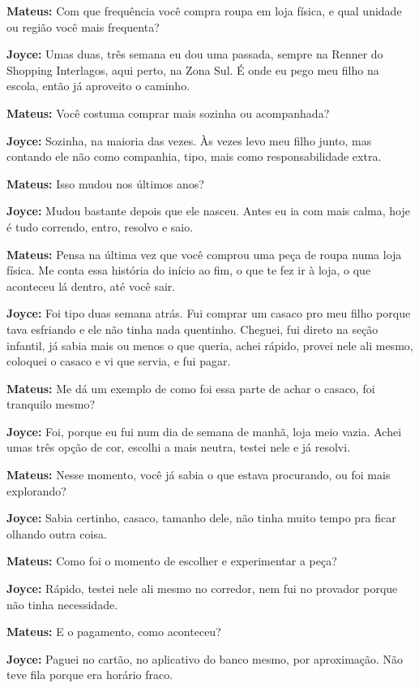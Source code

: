 \textbf{Mateus:} Com que frequência você compra roupa em loja física, e qual unidade ou região você mais frequenta?

\textbf{Joyce:} Umas duas, três semana eu dou uma passada, sempre na Renner do Shopping Interlagos, aqui perto, na Zona Sul. É onde eu pego meu filho na escola, então já aproveito o caminho.

\textbf{Mateus:} Você costuma comprar mais sozinha ou acompanhada?

\textbf{Joyce:} Sozinha, na maioria das vezes. Às vezes levo meu filho junto, mas contando ele não como companhia, tipo, mais como responsabilidade extra.

\textbf{Mateus:} Isso mudou nos últimos anos?

\textbf{Joyce:} Mudou bastante depois que ele nasceu. Antes eu ia com mais calma, hoje é tudo correndo, entro, resolvo e saio.

\textbf{Mateus:} Pensa na última vez que você comprou uma peça de roupa numa loja física. Me conta essa história do início ao fim, o que te fez ir à loja, o que aconteceu lá dentro, até você sair.

\textbf{Joyce:} Foi tipo duas semana atrás. Fui comprar um casaco pro meu filho porque tava esfriando e ele não tinha nada quentinho. Cheguei, fui direto na seção infantil, já sabia mais ou menos o que queria, achei rápido, provei nele ali mesmo, coloquei o casaco e vi que servia, e fui pagar.

\textbf{Mateus:} Me dá um exemplo de como foi essa parte de achar o casaco, foi tranquilo mesmo?

\textbf{Joyce:} Foi, porque eu fui num dia de semana de manhã, loja meio vazia. Achei umas três opção de cor, escolhi a mais neutra, testei nele e já resolvi.

\textbf{Mateus:} Nesse momento, você já sabia o que estava procurando, ou foi mais explorando?

\textbf{Joyce:} Sabia certinho, casaco, tamanho dele, não tinha muito tempo pra ficar olhando outra coisa.

\textbf{Mateus:} Como foi o momento de escolher e experimentar a peça?

\textbf{Joyce:} Rápido, testei nele ali mesmo no corredor, nem fui no provador porque não tinha necessidade.

\textbf{Mateus:} E o pagamento, como aconteceu?

\textbf{Joyce:} Paguei no cartão, no aplicativo do banco mesmo, por aproximação. Não teve fila porque era horário fraco.

